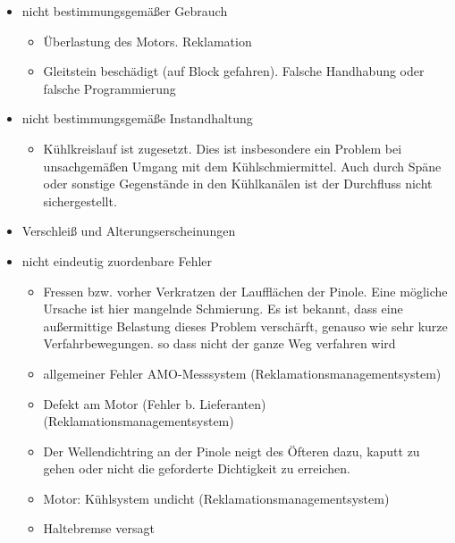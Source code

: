 \begin{itemize}
 
 \item nicht bestimmungsgemäßer Gebrauch
 \begin{itemize}
    \item Überlastung des Motors. Reklamation
    \item Gleitstein beschädigt (auf Block gefahren). Falsche Handhabung oder falsche Programmierung
 \end{itemize}
 
 
 
 
 \item nicht bestimmungsgemäße Instandhaltung
 \begin{itemize}
    \item Kühlkreislauf ist zugesetzt. Dies ist insbesondere ein Problem bei unsachgemäßen Umgang mit dem Kühlschmiermittel. Auch durch Späne oder sonstige Gegenstände in den Kühlkanälen ist der Durchfluss nicht sichergestellt.
 \end{itemize}
 
 
 \item Verschleiß und Alterungserscheinungen
 
 \clearpage
 
 \item nicht eindeutig zuordenbare Fehler
 \begin{itemize}
    \item Fressen bzw. vorher Verkratzen der Laufflächen der Pinole. Eine mögliche Ursache ist hier mangelnde Schmierung. Es ist bekannt, dass eine außermittige Belastung dieses Problem verschärft, genauso wie sehr kurze Verfahrbewegungen. so dass nicht der ganze Weg verfahren wird
    \item allgemeiner Fehler AMO-Messsystem (Reklamationsmanagementsystem)
    \item Defekt am Motor (Fehler b. Lieferanten) (Reklamationsmanagementsystem)
    \item Der Wellendichtring an der Pinole neigt des Öfteren dazu, kaputt zu gehen oder nicht die geforderte Dichtigkeit zu erreichen.
    \item Motor: Kühlsystem undicht (Reklamationsmanagementsystem)
    \item Haltebremse versagt
 \end{itemize}
\end{itemize}



% 
%

%

%


